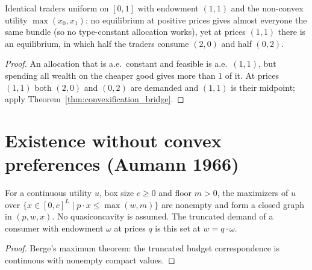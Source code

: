 \begin{theorem}
\label{thm:continuum_nonconvex_witness}
\leanok
{}
Identical traders uniform on $[0,1]$ with endowment $(1,1)$ and the non-convex utility $\max(x_0, x_1)$: no equilibrium at
positive prices gives almost everyone the same bundle (so no type-constant allocation works), yet at prices $(1,1)$ there is an equilibrium, in which half the traders
consume $(2,0)$ and half $(0,2)$.
\end{theorem}
\begin{proof}
\leanok
An allocation that is a.e.\ constant and feasible is a.e.\ $(1,1)$, but spending all wealth on the cheaper good gives more than $1$ of it. At prices
$(1,1)$ both $(2,0)$ and $(0,2)$ are demanded and $(1,1)$ is their midpoint; apply
Theorem~\ref{thm:convexification_bridge}.
\end{proof}

\section{Existence without convex preferences (Aumann 1966)}
\label{sec:aumann_existence}

\begin{lemma}
\label{lem:truncdemand_nonconvex}
\leanok
For a continuous utility $u$, box size $c \ge 0$ and floor $m > 0$, the maximizers of $u$ over
$\{x \in [0,c]^L \mid p \cdot x \le \max(w, m)\}$ are nonempty and form a closed graph in $(p, w, x)$. No quasiconcavity
is assumed. The truncated demand of a consumer with endowment $\omega$ at prices $q$ is this set at $w = q\cdot\omega$.
\end{lemma}
\begin{proof}
\leanok
Berge's maximum theorem: the truncated budget correspondence is continuous with nonempty compact values.
\end{proof}

